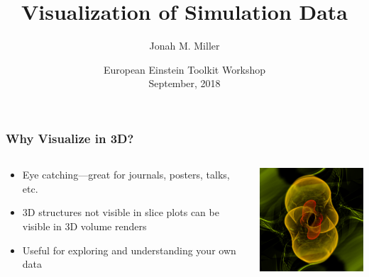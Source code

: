 \documentclass[]{beamer}
\title[Visualization]{Visualization of Simulation Data}
\author[J. Miller]{Jonah M. Miller}
\institute[LANL]{\color{blue}Los Alamos National Lab}
\date[ET Workshop]{\color{black}European Einstein Toolkit Workshop\\September, 2018}
\begin{document}
\begin{frame}[plain]
\titlepage
\end{frame}

\begin{frame}
  \frametitle{Why Visualize in 3D?}
  \begin{columns}
    \begin{column}{6cm}
      \begin{itemize}
      \item Eye catching---great for journals, posters, talks, etc.
      \item 3D structures not visible in slice plots can be visible in
        3D volume renders
      \item Useful for exploring and understanding your own data
      \end{itemize}
    \end{column}
    \begin{column}{6cm}
      \begin{center}
        \includegraphics[width=5.5cm]{figures/psi4r-it-1024/psi4r-iteration-1024-volume-f-32}
      \end{center}
    \end{column}
  \end{columns}
\end{frame}
\end{document}
